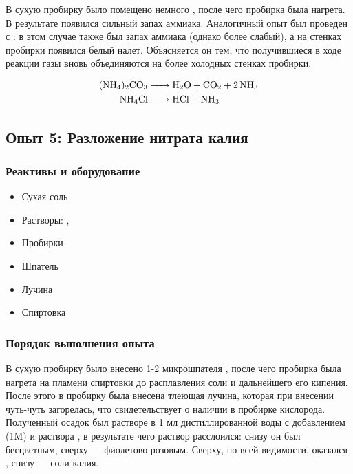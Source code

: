 \documentclass[a4paper, 12pt]{article}
\begin{document}
В сухую пробирку было помещено немного , после чего пробирка была нагрета. В результате появился сильный запах аммиака. Аналогичный опыт был проведен с : в этом случае также был запах аммиака (однако более слабый), а на стенках пробирки появился белый налет. Объясняется он тем, что получившиеся в ходе реакции газы вновь объединяются на более холодных стенках пробирки.

\begin{align}
	\ce{(NH4)2CO3 &-> H2O + CO2 + 2 NH3}\\
	\ce{NH4Cl &-> HCl + NH3}
\end{align}


\subsection{Опыт 5: Разложение нитрата калия}

\subsubsection{Реактивы и оборудование}

\begin{itemize}
	\item Сухая соль 
	
	\item Растворы: , 
	
	\item Пробирки
	
	\item Шпатель
	
	\item Лучина
	
	\item Спиртовка
\end{itemize}

\subsubsection{Порядок выполнения опыта}

В сухую пробирку было внесено 1-2 микрошпателя , после чего пробирка была нагрета на пламени спиртовки до расплавления соли и дальнейшего его кипения. После этого в пробирку была внесена тлеющая лучина, которая при внесении чуть-чуть загорелась, что свидетельствует о наличии в пробирке кислорода. Полученный осадок был растворе в 1 мл дистиллированной воды с добавлением  (1M) и раствора , в результате чего раствор расслоился: снизу он был бесцветным, сверху --- фиолетово-розовым. Сверху, по всей видимости, оказался , снизу --- соли калия. %
\end{document}
